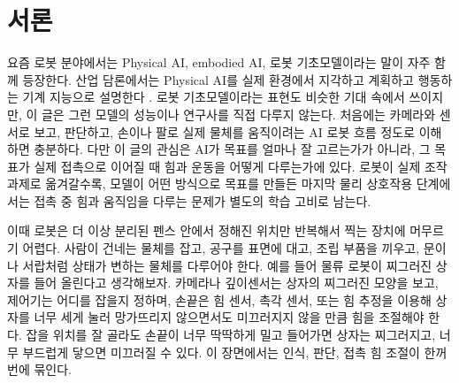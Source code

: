 \section{서론}

요즘 로봇 분야에서는 Physical AI, embodied AI, 로봇 기초모델이라는 말이 자주 함께 등장한다.
산업 담론에서는 Physical AI를 실제 환경에서 지각하고 계획하고 행동하는 기계 지능으로 설명한다 \cite{nvidia_physical_ai_2025}.
로봇 기초모델이라는 표현도 비슷한 기대 속에서 쓰이지만, 이 글은 그런 모델의 성능이나 연구사를 직접 다루지 않는다.
처음에는 카메라와 센서로 보고, 판단하고, 손이나 팔로 실제 물체를 움직이려는 AI 로봇 흐름 정도로 이해하면 충분하다.
다만 이 글의 관심은 AI가 목표를 얼마나 잘 고르는가가 아니라, 그 목표가 실제 접촉으로 이어질 때 힘과 운동을 어떻게 다루는가에 있다.
로봇이 실제 조작 과제로 옮겨갈수록, 모델이 어떤 방식으로 목표를 만들든 마지막 물리 상호작용 단계에서는 접촉 중 힘과 움직임을 다루는 문제가 별도의 학습 고비로 남는다.

이때 로봇은 더 이상 분리된 펜스 안에서 정해진 위치만 반복해서 찍는 장치에 머무르기 어렵다.
사람이 건네는 물체를 잡고, 공구를 표면에 대고, 조립 부품을 끼우고, 문이나 서랍처럼 상태가 변하는 물체를 다루어야 한다.
예를 들어 물류 로봇이 찌그러진 상자를 들어 올린다고 생각해보자.
카메라나 깊이센서는 상자의 찌그러진 모양을 보고, 제어기는 어디를 잡을지 정하며, 손끝은 힘 센서, 촉각 센서, 또는 힘 추정을 이용해 상자를 너무 세게 눌러 망가뜨리지 않으면서도 미끄러지지 않을 만큼 힘을 조절해야 한다.
잡을 위치를 잘 골라도 손끝이 너무 딱딱하게 밀고 들어가면 상자는 찌그러지고, 너무 부드럽게 닿으면 미끄러질 수 있다.
이 장면에서는 인식, 판단, 접촉 힘 조절이 한꺼번에 묶인다.

